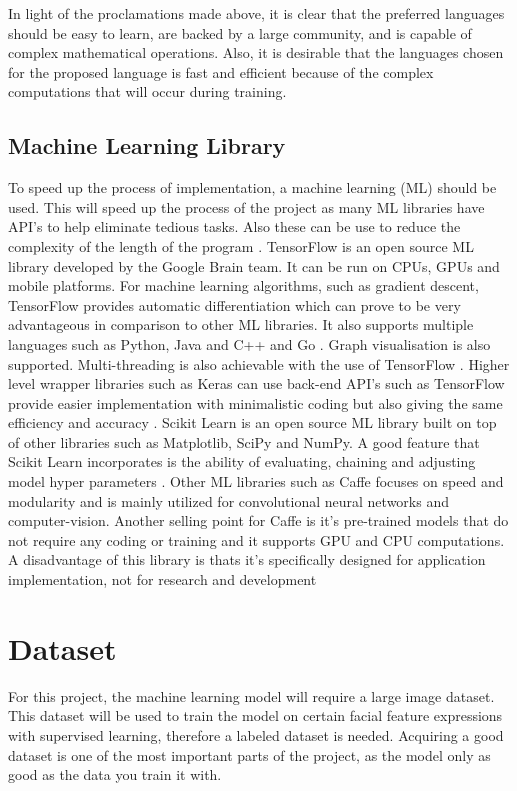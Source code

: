 In light of the proclamations made above, it is clear that the preferred languages should be easy to learn, are backed by a large community, and is capable of complex mathematical operations. Also, it is desirable that the languages chosen for the proposed language is fast and efficient because of the complex computations that will occur during training.

\newpage

\subsection{Machine Learning Library}
To speed up the process of implementation, a machine learning (ML) should be used. This will speed up the process of the project as many ML libraries have API's to help eliminate tedious tasks. Also these can be use to reduce the complexity of the length of the program \citep{jain}.
TensorFlow is an open source ML library developed by the Google Brain team. It can be run on CPUs, GPUs and mobile platforms. For machine learning algorithms, such as gradient descent, TensorFlow provides automatic differentiation which can prove to be very advantageous in comparison to other ML libraries. It also supports multiple languages such as Python, Java and C++ and Go \citep{jain}. Graph visualisation is also supported. Multi-threading is also achievable with the use of TensorFlow \citep{jain}. Higher level wrapper libraries such as Keras can use back-end API's such as TensorFlow provide easier implementation with minimalistic coding but also giving the same efficiency and accuracy \citep{lee_keras}. Scikit Learn is an open source ML library built on top of other libraries such as Matplotlib, SciPy and NumPy. A good feature that Scikit Learn incorporates is the ability of evaluating, chaining and adjusting model hyper parameters \citep{jain}.
Other ML libraries such as Caffe focuses on speed and modularity and is mainly utilized for convolutional neural networks and computer-vision. Another selling point for Caffe is it’s pre-trained models that do not require any coding or training and it supports GPU and CPU computations. A disadvantage of this library is thats it's specifically designed for application implementation, not for research and development \citep{jain}

\section{Dataset}
For this project, the machine learning model will require a large image dataset. This dataset will be used to train the model on certain facial feature expressions with supervised learning, therefore a labeled dataset is needed. Acquiring a good dataset is one of the most important parts of the project, as the model only as good as the data you train it with.


